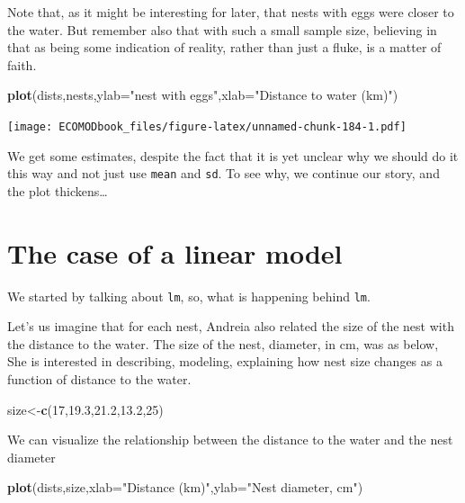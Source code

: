 \documentclass[
]{book}
\newenvironment{Shaded}{\begin{snugshade}}{\end{snugshade}}
\newcommand{\DataTypeTok}[1]{\textcolor[rgb]{0.13,0.29,0.53}{#1}}
\newcommand{\DecValTok}[1]{\textcolor[rgb]{0.00,0.00,0.81}{#1}}
\newcommand{\FloatTok}[1]{\textcolor[rgb]{0.00,0.00,0.81}{#1}}
\newcommand{\KeywordTok}[1]{\textcolor[rgb]{0.13,0.29,0.53}{\textbf{#1}}}
\newcommand{\NormalTok}[1]{#1}
\newcommand{\StringTok}[1]{\textcolor[rgb]{0.31,0.60,0.02}{#1}}
\begin{document}
Note that, as it might be interesting for later, that nests with eggs were closer to the water. But remember also that with such a small sample size, believing in that as being some indication of reality, rather than just a fluke, is a matter of faith.

\begin{Shaded}
\begin{Highlighting}[]
\KeywordTok{plot}\NormalTok{(dists,nests,}\DataTypeTok{ylab=}\StringTok{"nest with eggs"}\NormalTok{,}\DataTypeTok{xlab=}\StringTok{"Distance to water (km)"}\NormalTok{)}
\end{Highlighting}
\end{Shaded}

\texttt{[image: ECOMODbook\_files/figure-latex/unnamed-chunk-184-1.pdf]}

We get some estimates, despite the fact that it is yet unclear why we should do it this way and not just use \texttt{mean} and \texttt{sd}. To see why, we continue our story, and the plot thickens\ldots{}

\hypertarget{the-case-of-a-linear-model}{%
\section{The case of a linear model}\label{the-case-of-a-linear-model}}

We started by talking about \texttt{lm}, so, what is happening behind \texttt{lm}.

Let's us imagine that for each nest, Andreia also related the size of the nest with the distance to the water. The size of the nest, diameter, in cm, was as below, She is interested in describing, modeling, explaining how nest size changes as a function of distance to the water.

\begin{Shaded}
\begin{Highlighting}[]
\NormalTok{size<-}\KeywordTok{c}\NormalTok{(}\DecValTok{17}\NormalTok{,}\FloatTok{19.3}\NormalTok{,}\FloatTok{21.2}\NormalTok{,}\FloatTok{13.2}\NormalTok{,}\DecValTok{25}\NormalTok{)}
\end{Highlighting}
\end{Shaded}

We can visualize the relationship between the distance to the water and the nest diameter

\begin{Shaded}
\begin{Highlighting}[]
\KeywordTok{plot}\NormalTok{(dists,size,}\DataTypeTok{xlab=}\StringTok{"Distance (km)"}\NormalTok{,}\DataTypeTok{ylab=}\StringTok{"Nest diameter, cm"}\NormalTok{)}
\end{Highlighting}
\end{Shaded}
\end{document}
